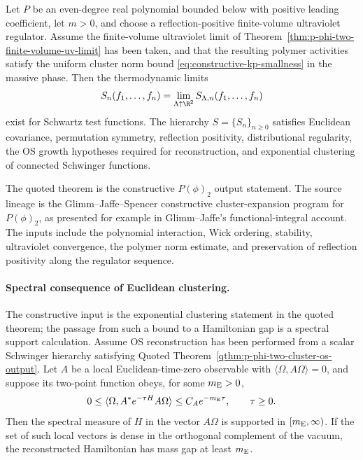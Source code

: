 \begin{quotedtheorem}
\label{qthm:p-phi-two-cluster-os-output}
Let \(P\) be an even-degree real polynomial bounded below with positive
leading coefficient, let \(m>0\), and choose a reflection-positive
finite-volume ultraviolet regulator.  Assume the finite-volume ultraviolet
limit of Theorem~\ref{thm:p-phi-two-finite-volume-uv-limit} has been taken,
and that the resulting polymer activities satisfy the uniform cluster norm
bound \eqref{eq:constructive-kp-smallness} in the massive phase.  Then the
thermodynamic limits
\[
  S_n(f_1,\ldots,f_n)
  =
  \lim_{\Lambda\uparrow\R^2}S_{\Lambda,n}(f_1,\ldots,f_n)
\]
exist for Schwartz test functions.  The hierarchy \(S=\{S_n\}_{n\geq0}\)
satisfies Euclidean covariance, permutation symmetry, reflection positivity,
distributional regularity, the OS growth hypotheses required for
reconstruction, and exponential clustering of connected Schwinger functions.
\end{quotedtheorem}

The quoted theorem is the constructive \(P(\phi)_2\) output statement.  The
source lineage is the Glimm--Jaffe--Spencer constructive cluster-expansion
program for \(P(\phi)_2\), as presented for example in Glimm--Jaffe's
functional-integral account.  The inputs include the polynomial interaction,
Wick ordering, stability, ultraviolet convergence, the polymer norm estimate,
and preservation of reflection positivity along the regulator sequence.

\paragraph{Spectral consequence of Euclidean clustering.}
The constructive input is the exponential clustering statement in the quoted
theorem; the passage from such a bound to a Hamiltonian gap is a spectral
support calculation.  Assume OS reconstruction has been performed from a scalar
Schwinger hierarchy satisfying Quoted
Theorem~\ref{qthm:p-phi-two-cluster-os-output}.  Let \(A\) be a local
Euclidean-time-zero observable with \(\langle\Omega,A\Omega\rangle=0\), and
suppose its two-point function obeys, for some \(m_{\rm E}>0\),
\[
  0\leq
  \langle\Omega,A^*e^{-\tau H}A\Omega\rangle
  \leq C_A e^{-m_{\rm E}\tau},
  \qquad \tau\geq0 .
\]
Then the spectral measure of \(H\) in the vector \(A\Omega\) is supported in
\([m_{\rm E},\infty)\).  If the set of such local vectors is dense in the
orthogonal complement of the vacuum, the reconstructed Hamiltonian has mass
gap at least \(m_{\rm E}\).

